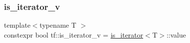 \mbox{\label{namespacetf_a7492bd7f91002715d38e477e86ec38c9}} 
\subsubsection{\texorpdfstring{is\+\_\+iterator\+\_\+v}{is\_iterator\_v}}
{\footnotesize\ttfamily template$<$typename T $>$ \\
constexpr bool tf\+::is\+\_\+iterator\+\_\+v = \hyperlink{structtf_1_1is__iterator}{is\+\_\+iterator}$<$T$>$\+::value\hspace{0.3cm}{\ttfamily [inline]}}

